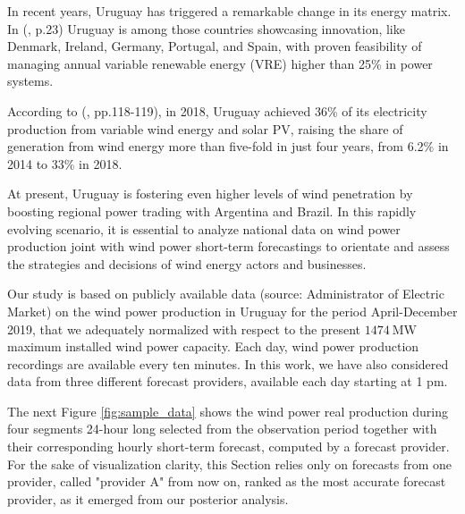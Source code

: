 \documentclass[11pt]{article}
\theoremstyle{definition}
\begin{document}
In recent years, Uruguay has triggered a remarkable change in its energy matrix. In (\cite{irena}, p.23) Uruguay is among those countries showcasing innovation, like Denmark, Ireland, Germany, Portugal, and Spain, with proven feasibility of managing annual variable renewable energy (VRE) higher than 25\% in power systems. 

According to (\cite{ren21}, pp.118-119), in 2018, Uruguay achieved 36\% of its electricity production from variable wind energy and solar PV, raising the share of generation from wind energy more than five-fold in just four years, from 6.2\% in 2014 to 33\% in 2018. 

At present, Uruguay is fostering even higher levels of wind penetration by boosting regional power trading with Argentina and Brazil. 
In this rapidly evolving scenario, it is essential to analyze national data on wind power production joint with wind power short-term forecastings to orientate and assess the strategies and decisions of wind energy actors and businesses. 

Our study is based on publicly available data (source: Administrator of Electric Market) on the wind power production in Uruguay for the period April-December 2019, that we adequately normalized with respect to the present $\SI{1474}{\mega\watt}$ maximum installed wind power capacity. Each day, wind power production recordings are available every ten minutes.  In this work, we have also considered data from three different forecast providers, available each day starting at 1 pm.

The next Figure \ref{fig:sample_data} shows the wind power real production during four segments 24-hour long selected from the observation period together with their corresponding hourly short-term forecast, computed by a forecast provider. For the sake of visualization clarity, this Section relies only on forecasts from one provider, called "provider A" from now on, ranked as the most accurate forecast provider, as it emerged from our posterior analysis. 
\end{document}
